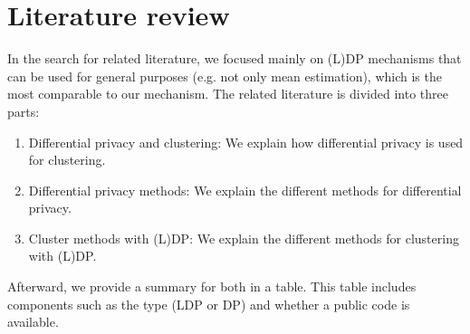 \section{Literature review} \label{theory:literature-review}
In the search for related literature, we focused mainly on (L)DP mechanisms that can be used for general purposes (e.g. not only mean estimation), which is the most comparable to our mechanism.
The related literature is divided into three parts:
\begin{enumerate}
  \item Differential privacy and clustering: We explain how differential privacy is used for clustering.
  \item Differential privacy methods: We explain the different methods for differential privacy.
  \item Cluster methods with (L)DP: We explain the different methods for clustering with (L)DP.
\end{enumerate}
Afterward, we provide a summary for both in a table.
This table includes components such as the type (LDP or DP) and whether a public code is available.

